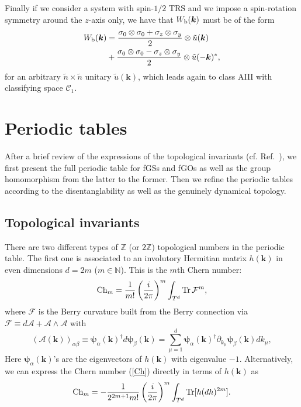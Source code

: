 \documentclass[prl,twocolumn,preprintnumbers,superscriptaddress,amsmath,amssymb]{revtex4-1}
\newcommand{\Tr}{\operatorname{Tr}}
\begin{document}
Finally if we consider a system with spin-$1/2$ TRS and we impose a spin-rotation symmetry around the $z$-axis only, we have that $W_{\rm b}(\boldsymbol{k})$ must be of the form
\begin{equation}
\begin{split}
W_{\rm b}(\boldsymbol{k}) &= \frac{\sigma_0\otimes\sigma_0 + \sigma_z\otimes\sigma_y}{2}\otimes  \tilde u(\boldsymbol{k}) \\
&+ \frac{\sigma_0\otimes\sigma_0 - \sigma_z\otimes\sigma_y}{2}\otimes \tilde u(-\boldsymbol{k})^*,
\end{split}
\end{equation}
for an arbitrary $\tilde n\times \tilde n$ unitary $\tilde u(\boldsymbol{k})$, which leads again to class AIII with classifying space $\mathcal{C}_1$.



\section{Periodic tables}
After a brief review of the expressions of the topological invariants (cf. Ref.~\cite{Ryu2016}), we first present the full periodic table for fGSs and fGOs as well as the group homomorphism from the latter to the former. Then we refine the periodic tables according to the disentanglability as well as the genuinely dynamical topology.


\subsection{Topological invariants}
There are two different types of $\mathbb{Z}$ (or $2\mathbb{Z}$) topological numbers in the periodic table. The first one is associated to an involutory Hermitian matrix $h(\boldsymbol{k})$ in even dimensions $d=2m$ ($m\in\mathbb{N}$). This is the $m$th Chern number: 
\begin{equation}
{\rm Ch}_m = \frac{1}{m!}\left(\frac{i}{2\pi}\right)^m \int_{T^d} \Tr\mathcal{F}^m,
\label{Ch}
\end{equation}
where $\mathcal{F}$ is the Berry curvature built from the Berry connection via $\mathcal{F} \equiv d\mathcal{A}+ \mathcal{A}\wedge\mathcal{A}$ with
\begin{equation}
(\mathcal{A}(\boldsymbol{k}))_{\alpha\beta}\equiv\boldsymbol{\psi}_\alpha(\boldsymbol{k})^\dag d\boldsymbol{\psi}_\beta(\boldsymbol{k}) =\sum^d_{\mu=1} \boldsymbol{\psi}_\alpha(\boldsymbol{k})^\dag \partial_{k_\mu} \boldsymbol{\psi}_\beta(\boldsymbol{k}) dk_\mu,
\label{FA}
\end{equation}
Here $\boldsymbol{\psi}_\alpha(\boldsymbol{k})$'s are the eigenvectors of $h(\boldsymbol{k})$ with eigenvalue $-1$. Alternatively, we can express the Chern number (\ref{Ch}) directly in terms of $h(\boldsymbol{k})$ as
\begin{equation}
{\rm Ch}_m = -\frac{1}{2^{2m+1}m!}\left(\frac{i}{2\pi}\right)^m \int_{T^d} \Tr[h(dh)^{2m}].
\label{Ch2}
\end{equation}
\end{document}

